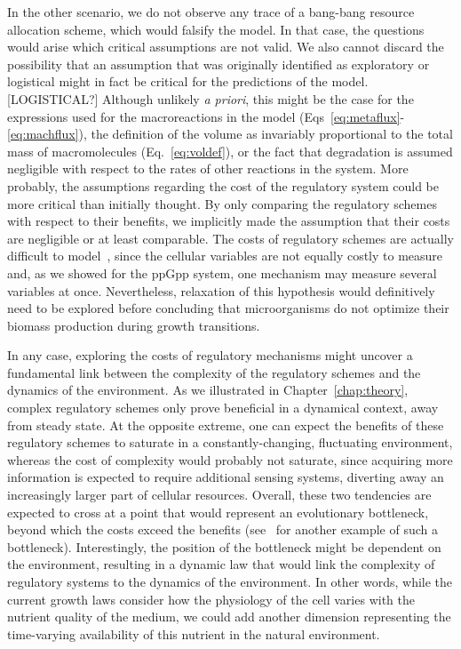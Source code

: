 In the other scenario, we do not observe any trace of a bang-bang resource allocation scheme, which would falsify the model.
In that case, the questions would arise which critical assumptions are not valid.
We also cannot discard the possibility that an assumption that was originally identified as exploratory or logistical might in fact be critical for the predictions of the model. [LOGISTICAL?]
Although unlikely \textit{a priori}, this might be the case for the expressions used for the macroreactions in the model (Eqs~\ref{eq:metaflux}-\ref{eq:machflux}), the definition of the volume as invariably proportional to the total mass of macromolecules (Eq.~\ref{eq:voldef}), or the fact that degradation is assumed negligible with respect to the rates of other reactions in the system.
More probably, the assumptions regarding the cost of the regulatory system could be more critical than initially thought.
By only comparing the regulatory schemes with respect to their benefits, we implicitly made the assumption that their costs are negligible or at least comparable.
The costs of regulatory schemes are actually difficult to model~\cite{shachrai_cost_2010,dong_gratuitous_1995,dekel_environmental_2005}, since the cellular variables are not equally costly to measure and, as we showed for the ppGpp system, one mechanism may measure several variables at once.
Nevertheless, relaxation of this hypothesis would definitively need to be explored before concluding that microorganisms do not optimize their biomass production during growth transitions.

In any case, exploring the costs of regulatory mechanisms might uncover a fundamental link between the complexity of the regulatory schemes and the dynamics of the environment.
As we illustrated in Chapter~\ref{chap:theory}, complex regulatory schemes only prove beneficial in a dynamical context, away from steady state.
At the opposite extreme, one can expect the benefits of these regulatory schemes to saturate in a constantly-changing, fluctuating environment, whereas the cost of complexity would probably not saturate, since acquiring more information is expected to require additional sensing systems, diverting away an increasingly larger part of cellular resources.
Overall, these two tendencies are expected to cross at a point that would represent an evolutionary bottleneck, beyond which the costs exceed the benefits (see~\cite{short_flows_2006} for another example of such a bottleneck).
Interestingly, the position of the bottleneck might be dependent on the environment, resulting in a dynamic law that would link the complexity of regulatory systems to the dynamics of the environment.
In other words, while the current growth laws consider how the physiology of the cell varies with the nutrient quality of the medium, we could add another dimension representing the time-varying availability of this nutrient in the natural environment.
